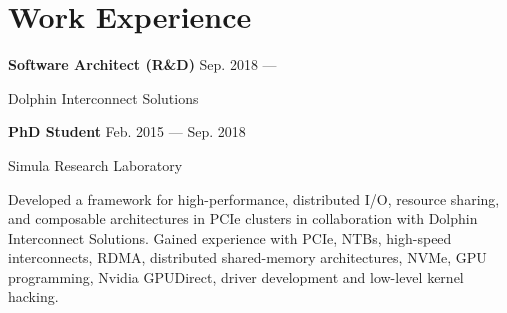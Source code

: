 \section{Work Experience}
\parbox[t][][t]{\linewidth}{
	\parbox{\linewidth}{
		\textbf{Software Architect (R\&D)}
			\hfill
			{Sep. 2018 --- \phantom{XXX. 0000}}
		}
	\smallbreak
	\parbox{\linewidth}{Dolphin Interconnect Solutions}
	\smallskip
	\smallskip
}
\parbox[t][][t]{\linewidth}{
	{\parbox{\linewidth}{
		\parbox{\linewidth}{
			\textbf{PhD Student}
			\hfill
			{Feb. 2015 --- Sep. 2018}
		}
	}}
	\smallbreak
	\parbox{\linewidth}{Simula Research Laboratory}

	
	\bigskip
	Developed a framework for high-performance, distributed I/O, resource sharing,
	and composable architectures in PCIe clusters in collaboration with Dolphin Interconnect Solutions.
	Gained experience with PCIe, NTBs, high-speed interconnects, RDMA, distributed shared-memory
	architectures, NVMe, GPU programming, Nvidia GPUDirect, driver development and low-level kernel hacking.

}
